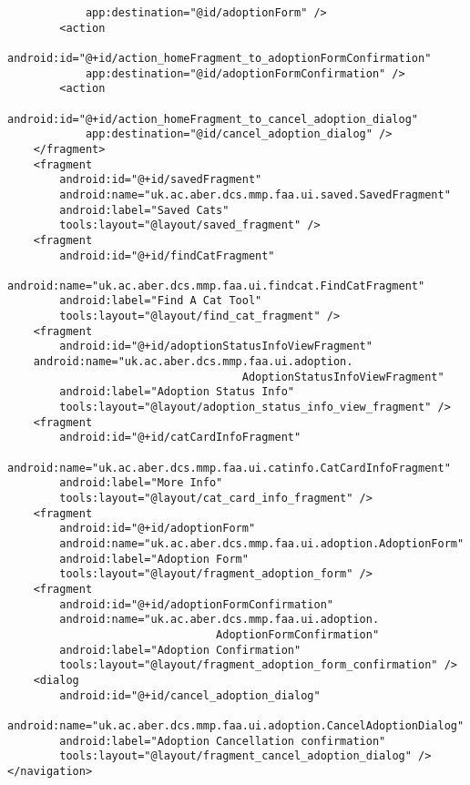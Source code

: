 \begin{verbatim}
            app:destination="@id/adoptionForm" />
        <action
            android:id="@+id/action_homeFragment_to_adoptionFormConfirmation"
            app:destination="@id/adoptionFormConfirmation" />
        <action
            android:id="@+id/action_homeFragment_to_cancel_adoption_dialog"
            app:destination="@id/cancel_adoption_dialog" />
    </fragment>
    <fragment
        android:id="@+id/savedFragment"
        android:name="uk.ac.aber.dcs.mmp.faa.ui.saved.SavedFragment"
        android:label="Saved Cats"
        tools:layout="@layout/saved_fragment" />
    <fragment
        android:id="@+id/findCatFragment"
        android:name="uk.ac.aber.dcs.mmp.faa.ui.findcat.FindCatFragment"
        android:label="Find A Cat Tool"
        tools:layout="@layout/find_cat_fragment" />
    <fragment
        android:id="@+id/adoptionStatusInfoViewFragment"
    android:name="uk.ac.aber.dcs.mmp.faa.ui.adoption.
                                    AdoptionStatusInfoViewFragment"
        android:label="Adoption Status Info"
        tools:layout="@layout/adoption_status_info_view_fragment" />
    <fragment
        android:id="@+id/catCardInfoFragment"
        android:name="uk.ac.aber.dcs.mmp.faa.ui.catinfo.CatCardInfoFragment"
        android:label="More Info"
        tools:layout="@layout/cat_card_info_fragment" />
    <fragment
        android:id="@+id/adoptionForm"
        android:name="uk.ac.aber.dcs.mmp.faa.ui.adoption.AdoptionForm"
        android:label="Adoption Form"
        tools:layout="@layout/fragment_adoption_form" />
    <fragment
        android:id="@+id/adoptionFormConfirmation"
        android:name="uk.ac.aber.dcs.mmp.faa.ui.adoption.
                                AdoptionFormConfirmation"
        android:label="Adoption Confirmation"
        tools:layout="@layout/fragment_adoption_form_confirmation" />
    <dialog
        android:id="@+id/cancel_adoption_dialog"
        android:name="uk.ac.aber.dcs.mmp.faa.ui.adoption.CancelAdoptionDialog"
        android:label="Adoption Cancellation confirmation"
        tools:layout="@layout/fragment_cancel_adoption_dialog" />
</navigation>
\end{verbatim}

